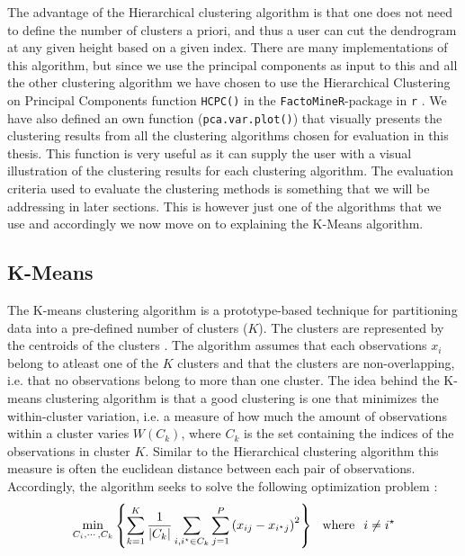 \documentclass[../thesis.tex]{subfiles}
\begin{document}
\indent The advantage of the Hierarchical clustering algorithm is that one does not need to define the number of clusters a priori, and thus a user can cut the dendrogram at any given height based on a given index. There are many implementations of this algorithm, but since we use the principal components as input to this and all the other clustering algorithm we have chosen to use the Hierarchical Clustering on Principal Components function \texttt{HCPC()} in the \texttt{FactoMineR}-package in \texttt{r} \citep{FactoMineR}. We have also defined an own function (\texttt{pca.var.plot()}) that visually presents the clustering results from all the clustering algorithms chosen for evaluation in this thesis. This function is very useful as it can supply the user with a visual illustration of the clustering results for each clustering algorithm. The evaluation criteria used to evaluate the clustering methods is something that we will be addressing in later sections. This is however just one of the algorithms that we use and accordingly we now move on to explaining the K-Means algorithm.

\subsection{K-Means}
\label{subsec:K-Means}

\noindent The K-means clustering algorithm \citep{forgy1965cluster} is a prototype-based technique for partitioning data into a pre-defined number of clusters ($K$). The clusters are represented by the centroids of the clusters \citep{tan2007introduction}. The algorithm assumes that each observations $x_i$ belong to atleast one of the $K$ clusters and that the clusters are non-overlapping, i.e. that no observations belong to more than one cluster. The idea behind the K-means clustering algorithm is that a good clustering is one that minimizes the within-cluster variation, i.e. a measure of how much the amount of observations within a cluster varies $W(C_k)$, where $C_k$ is the set containing the indices of the observations in cluster $K$. Similar to the Hierarchical clustering algorithm this measure is often the euclidean distance between each pair of observations. Accordingly, the algorithm seeks to solve the following optimization problem \citep{james2013introduction}:
\begin{align}
    \min_{C_i, \cdots, C_k} \left\{\sum_{k=1}^K \frac{1}{|C_k|} \sum_{i,i^\star \in C_k}\sum_{j=1}^P\left(x_{ij} - x_{i^\star j} \right)^2 \right\}\hspace*{0,25cm}\text{where}\hspace*{0,25cm} i \neq i^\star
\end{align}
\end{document}
